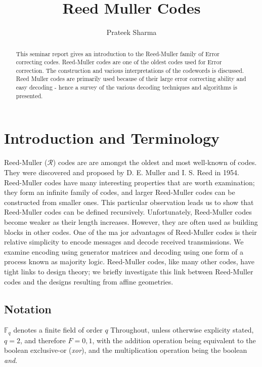 \documentclass{article}
\title{Reed Muller Codes}
\author{Prateek Sharma}
\newcommand{\F}{\ensuremath{\mathbb{F}}}
\begin{document}

\maketitle

\begin{abstract} 
This seminar report gives an introduction to the Reed-Muller family of Error correcting codes. Reed-Muller codes are one of the oldest codes used for Error correction. The construction and various interpretations of the codewords is discussed. Reed Muller codes are primarily used because of their large error correcting ability and easy decoding - hence a survey of the various decoding techniques and algorithms is presented.
\end{abstract}


\section {Introduction and Terminology}
Reed-Muller ($\mathcal{R}$) codes are are amongst the oldest and most well-known of codes. They were discovered and proposed by D. E. Muller and I. S. Reed in 1954. 
Reed-Muller codes have many interesting properties that are worth examination; they 
form an inﬁnite family of codes, and larger Reed-Muller codes can be constructed from 
smaller ones. This particular observation leads us to show that Reed-Muller codes can be 
deﬁned recursively. 
Unfortunately, Reed-Muller codes become weaker as their length increases. However, 
they are often used as building blocks in other codes. 
One of the ma jor advantages of Reed-Muller codes is their relative simplicity to encode 
messages and decode received transmissions. We examine encoding using generator matrices 
and decoding using one form of a process known as majority logic. 
Reed-Muller codes, like many other codes, have tight links to design theory; we brieﬂy 
investigate this link between Reed-Muller codes and the designs resulting from affine geometries. 

\subsection{Notation}
$\F _q$ denotes a finite field of order $q$
Throughout, unless otherwise explicity stated, $q=2$, and therefore $F={0,1}$, with the addition operation being equivalent to the boolean exclusive-or (\emph{xor}), and the multiplication operation being the boolean \emph{and}.
\end{document}
